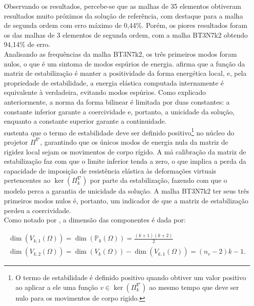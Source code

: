 \indent Observando os resultados, percebe-se que as malhas de 35 elementos obtiveram resultados muito próximos da solução de referência, com destaque para a malha de segunda ordem com erro máximo de 0,44\%. Porém, os piores resultados foram os das malhas de 3 elementos de segunda ordem, com a malha BT3N7k2 obtendo 94,14\% de erro.\\
\indent Analisando as frequências da malha BT3N7k2, os três primeiros modos foram nulos, o que é um sintoma de modos espúrios de energia. \citet{arbitraryorder2dvirtualelementspolygonalmeshespartelasticproblem2017a} afirma que a função da matriz de estabilização é manter a positividade da forma energética local, e, pela propriedade de estabilidade, a energia elástica computada internamente é equivalente à verdadeira, evitando modos espúrios. Como explicado anteriormente, a norma da forma bilinear é limitada por duas constantes: a constante inferior garante a coercividade e, portanto, a unicidade da solução, enquanto a constante superior garante a continuidade.\\
\indent \citet{virtualelementmethodgeneralsecondorderellipticproblemspolygonalmeshes2016} sustenta que o termo de estabilidade deve ser definido positivo\footnote{O termo de estabilidade é definido positivo quando obtiver um valor positivo ao aplicar a ele uma função $v \in \ker(\Pi_k^\nabla)$ ao mesmo tempo que deve ser nulo para os movimentos de corpo rigido.} no núcleo do projetor $\Pi^\nabla$, garantindo que os únicos modos de energia nula da matriz de rigidez local sejam os movimentos de corpo rígido. A má calibração da matriz de estabilização faz com que o limite inferior tenda a zero, o que implica a perda da capacidade de imposição de resistência elástica às deformações virtuais pertencentes ao $\ker(\Pi_k^\nabla)$ por parte da estabilização, fazendo com que o modelo perca a garantia de unicidade da solução. A malha BT3N7k2 ter seus três primeiros modos nulos é, portanto, um indicador de que a matriz de estabilização perdeu a coercividade.\\
\indent Como notado por \citet{illconditioningvirtualelementmethodstabilizationsbases2018}, a dimensão das componentes é dada por:

\begin{equation}
    \begin{aligned}
        \dim(V_{k,1}(\Omega)) = \dim(\mathbb{P}_{k}(\Omega)) = \frac{(k+1)(k+2)}{2} \\
        \dim(V_{k,2}(\Omega)) = \dim(V_{k}(\Omega)) - \dim(V_{k,1}(\Omega)) = (n_v - 2) k - 1. 
    \end{aligned}
\end{equation}


